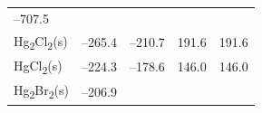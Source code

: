 \documentclass[
  9pt,
]{extbook}
\theoremstyle{definition}
\theoremstyle{definition}
\theoremstyle{definition}
\theoremstyle{remark}
\begin{document}
\begin{longtable}[]{@{}lllll@{}}
\begin{minipage}[t]{0.19\columnwidth}
--707.5\strut
\end{minipage} & \begin{minipage}[t]{0.20\columnwidth}\raggedright
\strut
\end{minipage} & \begin{minipage}[t]{0.18\columnwidth}\raggedright
\strut
\end{minipage} & \begin{minipage}[t]{0.18\columnwidth}\raggedright
\strut
\end{minipage}\tabularnewline
\begin{minipage}[t]{0.10\columnwidth}\raggedright
Hg\textsubscript{2}Cl\textsubscript{2}(s)\strut
\end{minipage} & \begin{minipage}[t]{0.19\columnwidth}\raggedright
--265.4\strut
\end{minipage} & \begin{minipage}[t]{0.20\columnwidth}\raggedright
--210.7\strut
\end{minipage} & \begin{minipage}[t]{0.18\columnwidth}\raggedright
191.6\strut
\end{minipage} & \begin{minipage}[t]{0.18\columnwidth}\raggedright
191.6\strut
\end{minipage}\tabularnewline
\begin{minipage}[t]{0.10\columnwidth}\raggedright
HgCl\textsubscript{2}(s)\strut
\end{minipage} & \begin{minipage}[t]{0.19\columnwidth}\raggedright
--224.3\strut
\end{minipage} & \begin{minipage}[t]{0.20\columnwidth}\raggedright
--178.6\strut
\end{minipage} & \begin{minipage}[t]{0.18\columnwidth}\raggedright
146.0\strut
\end{minipage} & \begin{minipage}[t]{0.18\columnwidth}\raggedright
146.0\strut
\end{minipage}\tabularnewline
\begin{minipage}[t]{0.10\columnwidth}\raggedright
Hg\textsubscript{2}Br\textsubscript{2}(s)\strut
\end{minipage} & \begin{minipage}[t]{0.19\columnwidth}\raggedright
--206.9\strut
\end{minipage} & \begin{minipage}[t]{0.20\columnwidth}\raggedright

\end{minipage}
\end{longtable}
\end{document}
